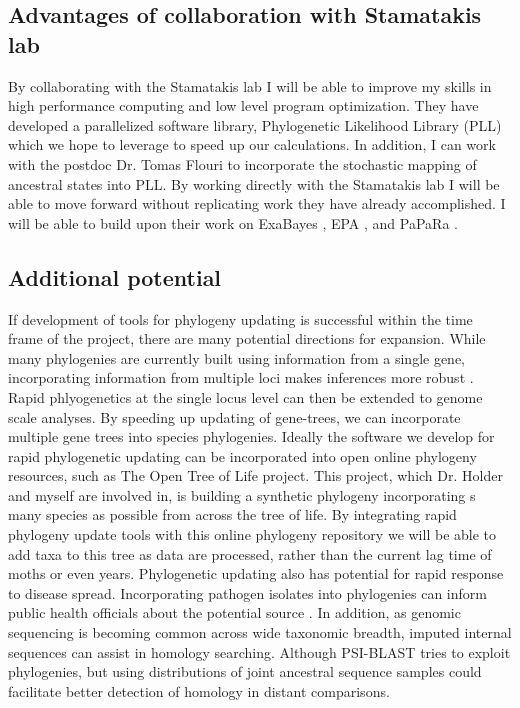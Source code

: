 \documentclass[10pt]{article}
\begin{document}
\subsection*{Advantages of collaboration with Stamatakis lab}

By collaborating with the Stamatakis lab I will be able to improve my skills in high performance computing and low level program optimization.
They have developed a parallelized software library, Phylogenetic Likelihood Library (PLL)  which we hope to leverage to speed up our calculations. 
In addition, I can work with the postdoc Dr. Tomas Flouri to incorporate the stochastic mapping of ancestral states into PLL.
By working directly with the Stamatakis lab I will be able to move forward without replicating work they have already accomplished.
I will be able to build upon their work on ExaBayes  \cite{Stamatakis_novel_2013} , EPA \cite{Berger_performance_2011}, and PaPaRa  \cite{Berger_aligning_2011} .


\subsection*{Additional potential}
If development of tools for phylogeny updating is successful within the time frame of the project, there are many potential directions for expansion. 
While many phylogenies are currently built using information from a single gene, incorporating information from multiple loci makes inferences more robust \cite{edwards_looking_2009}. 
Rapid phlyogenetics at the single locus level can then be extended to genome scale analyses.
By speeding up updating of gene-trees, we can incorporate multiple gene trees into species phylogenies.
Ideally the software we develop for rapid phylogenetic updating can be incorporated into open online phylogeny resources, such as The Open Tree of Life project. 
This project, which Dr. 
Holder and myself are involved in, is building a synthetic phylogeny incorporating s many species as possible from across the tree of life. 
By integrating rapid phylogeny update tools with this online phylogeny repository we will be able to add taxa to this tree as data are processed, rather than the current lag time of moths or even years. 
Phylogenetic updating also has potential for rapid response to disease spread. 
Incorporating pathogen isolates into phylogenies can inform public health officials about the potential source \cite{timme_phylogenetic_2013}.
In addition, as genomic sequencing is becoming common across wide taxonomic breadth, imputed internal sequences can assist in homology searching.
Although PSI-BLAST \cite{altschul_gapped_1997} tries to exploit phylogenies, but using distributions of joint ancestral sequence samples could facilitate better detection of homology in distant comparisons.
\end{document}
